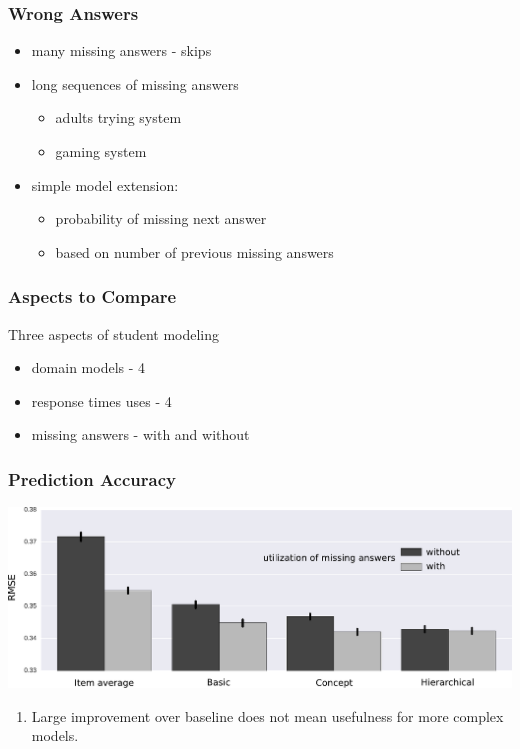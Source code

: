 \documentclass[xcolor=svgnames]{beamer}
\begin{document}
\begin{frame}
    \frametitle{Wrong Answers}

    \begin{itemize}
        \item many missing answers - skips
        \item long sequences of missing answers
        \begin{itemize}
            \item adults trying system
            \item gaming system
        \end{itemize}
        \item simple model extension:
        \begin{itemize}
            \item probability of missing next answer
            \item based on number of previous missing answers
        \end{itemize}
    \end{itemize}
\end{frame}
\begin{frame}
    \frametitle{Aspects to Compare}

    Three aspects of student modeling
    \begin{itemize}
        \item domain models - 4
        \item response times uses - 4
        \item missing answers - with and without
    \end{itemize}

\end{frame}
\begin{frame}
    \frametitle{Prediction Accuracy}

    \includegraphics[width=\linewidth]{figures/missing-answers}

    \begin{enumerate}
        \item Large improvement over baseline does not mean usefulness for more complex models.
    \end{enumerate}
\end{frame}
\end{document}
